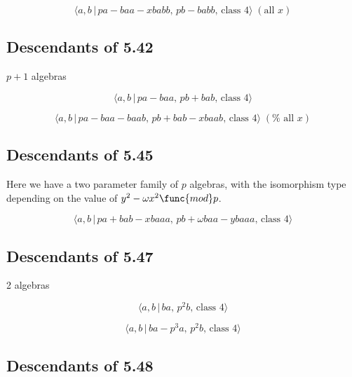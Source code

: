 \documentclass[10pt]{article}
\begin{document}
\begin{equation}
\langle a,b\,|\,pa-baa-xbabb,\,pb-babb,\,\text{class }4\rangle \;(\text{all }%
x)  \tag{6.424}
\end{equation}

\subsection{Descendants of 5.42}

$p+1$ algebras

\begin{equation}
\langle a,b\,|\,pa-baa,\,pb+bab,\,\text{class }4\rangle  \tag{6.425}
\end{equation}

\begin{equation}
\langle a,b\,|\,pa-baa-baab,\,pb+bab-xbaab,\,\text{class }4\rangle\;(\text{%
all }x)  \tag{6.426}
\end{equation}

\subsection{Descendants of 5.45}

Here we have a two parameter family of $p$ algebras, with the isomorphism
type depending on the value of $y^{2}-\omega x^{2}\func{mod}p$.

\begin{equation}
\langle a,b\,|\,pa+bab-xbaaa,\,pb+\omega baa-ybaaa,\,\text{class }4\rangle 
\tag{6.427}
\end{equation}

\subsection{Descendants of 5.47}

2 algebras

\begin{equation}
\langle a,b\,|\,ba,\,p^2b,\,\text{class }4\rangle  \tag{6.428}
\end{equation}

\begin{equation}
\langle a,b\,|\,ba-p^3a,\,p^2b,\,\text{class }4\rangle  \tag{6.429}
\end{equation}

\subsection{Descendants of 5.48}
\end{document}
